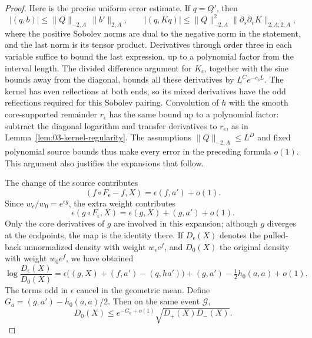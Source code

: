 \begin{proof}
Here is the precise uniform error estimate. If \(q=Q'\), then
\[
 |(q,b)|\le\|Q\|_{-2,A}\,\|b'\|_{2,A},\qquad
 |(q,Kq)|\le\|Q\|_{-2,A}^2
                \|\partial_s\partial_vK\|_{2,A;2,A},
\]
where the positive Sobolev norms are dual to the negative norm in the
statement, and the last norm is its tensor product. Derivatives through
order three in each variable suffice to bound the last expression,
up to a polynomial factor from the interval length. The divided
difference argument for \(K_\epsilon\), together with the sine bounds
away from the diagonal, bounds all these derivatives by
\(L^Ce^{-c_\delta L}\). The kernel has even reflections at both ends,
so its mixed derivatives have the odd reflections required for this
Sobolev pairing. Convolution of \(h\) with the smooth core-supported
remainder \(r_\epsilon\) has the same bound up to a polynomial factor:
subtract the diagonal logarithm and transfer derivatives to
\(r_\epsilon\), as in Lemma~\ref{lem:03-kernel-regularity}.
The assumptions \(\|Q\|_{-2,A}\le L^D\) and fixed polynomial source
bounds thus make every error in the preceding formula \(o(1)\).
This argument also justifies the expansions that follow.

The change of the source contributes
\[
 (f\circ F_\epsilon-f,X)=\epsilon(f,a')+o(1).
\]
Since \(w_\epsilon/w_0=e^{\epsilon g}\), the extra weight contributes
\[
 \epsilon(g\circ F_\epsilon,X)
       =\epsilon(g,X)+(g,a')+o(1).
\]
Only the core derivatives of \(g\) are involved in this expansion;
although \(g\) diverges at the endpoints, the map is the identity there.
If \(D_\epsilon(X)\) denotes the pulled-back unnormalized density with
weight \(w_\epsilon e^f\), and \(D_0(X)\) the original density with
weight \(w_0e^f\), we have obtained
\[
 \log\frac{D_\epsilon(X)}{D_0(X)}
 =\epsilon\bigl((g,X)+(f,a')-(q,ha')\bigr)
     +(g,a')-\tfrac12h_0(a,a)+o(1).
\]
The terms odd in \(\epsilon\) cancel in the geometric mean. Define
\(G_a=(g,a')-h_0(a,a)/2\). Then on the same event \(\mathcal G\),
\[
 D_0(X)\le e^{-G_a+o(1)}
                 \sqrt{D_+(X)D_-(X)}.
\]


\end{proof}
